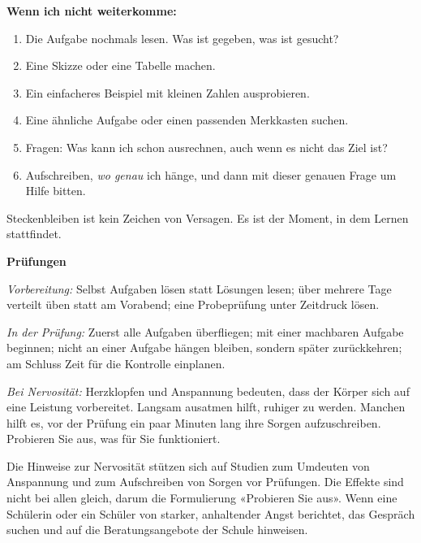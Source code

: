 \documentclass[11pt]{exam}
\begin{document}
\begin{merke}
\textbf{Wenn ich nicht weiterkomme:}
\begin{enumerate}
  \item Die Aufgabe nochmals lesen. Was ist gegeben, was ist gesucht?
  \item Eine Skizze oder eine Tabelle machen.
  \item Ein einfacheres Beispiel mit kleinen Zahlen ausprobieren.
  \item Eine ähnliche Aufgabe oder einen passenden Merkkasten suchen.
  \item Fragen: Was kann ich schon ausrechnen, auch wenn es nicht das Ziel ist?
  \item Aufschreiben, \emph{wo genau} ich hänge, und dann mit dieser genauen
        Frage um Hilfe bitten.
\end{enumerate}
Steckenbleiben ist kein Zeichen von Versagen. Es ist der Moment, in dem
Lernen stattfindet.
\end{merke}

\begin{merke}
\textbf{Prüfungen}

\emph{Vorbereitung:} Selbst Aufgaben lösen statt Lösungen lesen; über mehrere
Tage verteilt üben statt am Vorabend; eine Probeprüfung unter Zeitdruck lösen.

\emph{In der Prüfung:} Zuerst alle Aufgaben überfliegen; mit einer machbaren
Aufgabe beginnen; nicht an einer Aufgabe hängen bleiben, sondern später
zurückkehren; am Schluss Zeit für die Kontrolle einplanen.

\emph{Bei Nervosität:} Herzklopfen und Anspannung bedeuten, dass der Körper
sich auf eine Leistung vorbereitet. Langsam ausatmen hilft, ruhiger zu
werden. Manchen hilft es, vor der Prüfung ein paar Minuten lang ihre Sorgen
aufzuschreiben. Probieren Sie aus, was für Sie funktioniert.
\end{merke}

\begin{lehrperson}[Prüfungsangst]
Die Hinweise zur Nervosität stützen sich auf Studien zum Umdeuten von
Anspannung und zum Aufschreiben von Sorgen vor Prüfungen. Die Effekte sind
nicht bei allen gleich, darum die Formulierung «Probieren Sie aus». Wenn eine
Schülerin oder ein Schüler von starker, anhaltender Angst berichtet, das
Gespräch suchen und auf die Beratungsangebote der Schule hinweisen.
\end{lehrperson}
\end{document}
